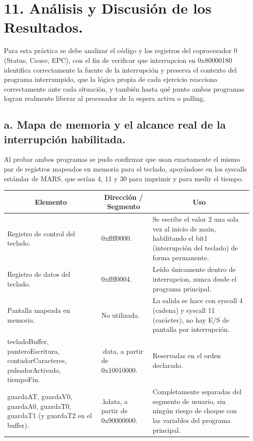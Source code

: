 \documentclass[12pt, letterpaper]{article}
\begin{document}
\section*{11. Análisis y Discusión de los Resultados.}

Para esta práctica se debe analizar el código y los registros del coprocesador 0 (Status, Cause, EPC), con el fin de verificar que interrupcion en 0x80000180 identifica correctamente la fuente de la interrupción y preserva el contexto del programa interrumpido, que la lógica propia de cada ejercicio reacciona correctamente ante cada situación, y también hasta qué punto ambos programas logran realmente liberar al procesador de la espera activa o polling.

\subsection*{a. Mapa de memoria y el alcance real de la interrupción habilitada.}

Al probar ambos programas se pudo confirmar que usan exactamente el mismo par de registros mapeados en memoria para el teclado, apoyándose en los syscalls estándar de MARS, que serían 4, 11 y 30 para imprimir y para medir el tiempo.

\begin{table}[h]
    \centering
    \begin{tabularx}{\linewidth}{| p{4.2cm} | p{3.2cm} | X |}
        \hline
        \multicolumn{1}{|c|}{\textbf{Elemento}} & 
        \multicolumn{1}{c|}{\textbf{Dirección / Segmento}} & 
        \multicolumn{1}{c|}{\textbf{Uso}} \\
        \hline
        Registro de control del teclado.& 0xffff0000.& Se escribe el valor 2 una sola vez al inicio de main, habilitando el bit1 (interrupción del teclado) de forma permanente.\\
        \hline
        Registro de datos del teclado.& 0xffff0004.& Leído únicamente dentro de interrupcion, nunca desde el programa principal.\\
        \hline
        Pantalla mapeada en memoria.& No utilizada.& La salida se hace con syscall 4 (cadena) y syscall 11 (carácter), no hay E/S de pantalla por interrupción.\\
        \hline
 tecladoBuffer, punteroEscritura, contadorCaracteres, pulsadorActivado, tiempoFin.& .data, a partir de 0x10010000.&Reservadas en el orden declarado.\\\hline
 guardaAT, guardaV0, guardaA0, guardaT0, guardaT1 (y guardaT2 en el buffer).& .kdata, a partir de 0x90000000.&Completamente separadas del segmento de usuario, sin ningún riesgo de choque con las variables del programa principal.\\\hline
    \end{tabularx}
\end{table}
\end{document}
